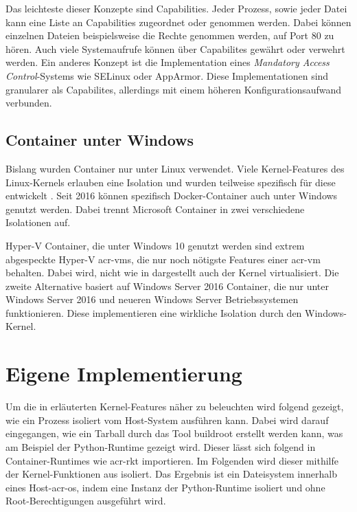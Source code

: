 Das leichteste dieser Konzepte sind Capabilities. Jeder Prozess, sowie jeder Datei kann eine Liste an Capabilities zugeordnet oder genommen werden. Dabei können einzelnen Dateien beispielsweise die Rechte genommen werden, auf Port 80 zu hören. Auch viele Systemaufrufe können über Capabilites gewährt oder verwehrt werden. Ein anderes Konzept ist die Implementation eines \textit{Mandatory Access Control}-Systems wie SELinux oder AppArmor. Diese Implementationen sind granularer als Capabilites, allerdings mit einem höheren Konfigurationsaufwand verbunden.

\subsection{Container unter Windows}
\label{sec:windows}
Bislang wurden Container nur unter Linux verwendet. Viele Kernel-Features des Linux-Kernels erlauben eine Isolation und wurden teilweise spezifisch für diese entwickelt \citep{Namespaces7LinuxManualPage}. Seit 2016 können spezifisch Docker-Container auch unter Windows genutzt werden. Dabei trennt Microsoft Container in zwei verschiedene Isolationen auf.

Hyper-V Container, die unter Windows 10 genutzt werden sind extrem abgespeckte Hyper-V \glspl{acr-vm}, die nur noch nötigste Features einer \gls{acr-vm} behalten. Dabei wird, nicht wie in  dargestellt auch der Kernel virtualisiert. Die zweite Alternative basiert auf Windows Server 2016 Container, die nur unter Windows Server 2016 und neueren Windows Server Betriebssystemen funktionieren. Diese implementieren eine wirkliche Isolation durch den Windows-Kernel.

\section{Eigene Implementierung}
\label{sec:eigeneImpl}
Um die in  erläuterten Kernel-Features näher zu beleuchten wird folgend gezeigt, wie ein Prozess isoliert vom Host-System ausführen kann. Dabei wird darauf eingegangen, wie ein Tarball durch das Tool buildroot erstellt werden kann, was am Beispiel der Python-Runtime gezeigt wird. Dieser lässt sich folgend in Container-Runtimes wie \gls{acr-rkt} importieren. Im Folgenden wird dieser mithilfe der Kernel-Funktionen aus  isoliert. Das Ergebnis ist ein Dateisystem innerhalb eines Host-\gls{acr-os}, indem  eine Instanz der Python-Runtime isoliert und ohne Root-Berechtigungen ausgeführt wird.

